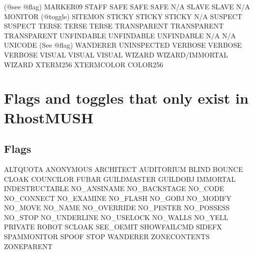 \documentclass[letterpaper,10pt,english]{sphinxmanual}
\begin{document}
\begin{description}
(@see @flag)            MARKER0\sphinxhyphen{}9                              STAFF
SAFE                    SAFE                                   SAFE
N/A                     SLAVE                                  SLAVE
N/A                     MONITOR (@toggle)                      SITEMON
STICKY                  STICKY                                 STICKY
N/A                     SUSPECT                                SUSPECT
TERSE                   TERSE                                  TERSE
TRANSPARENT             TRANSPARENT                            TRANSPARENT
UNFINDABLE              UNFINDABLE                             UNFINDABLE
N/A                     N/A                                    UNICODE
(See @flag)             WANDERER                               UNINSPECTED
VERBOSE                 VERBOSE                                VERBOSE
VISUAL                  VISUAL                                 VISUAL
WIZARD                  WIZARD/IMMORTAL                        WIZARD
XTERM256                XTERMCOLOR                             COLOR256

\end{description}


\section{Flags and toggles that only exist in RhostMUSH}
\label{\detokenize{differences:flags-and-toggles-that-only-exist-in-rhostmush}}

\subsection{Flags}
\label{\detokenize{differences:flags}}
\sphinxAtStartPar
ALTQUOTA                     ANONYMOUS                     ARCHITECT
AUDITORIUM                   BLIND                         BOUNCE
CLOAK                        COUNCILOR                     FUBAR
GUILDMASTER                  GUILDOBJ                      IMMORTAL
INDESTRUCTABLE               NO\_ANSINAME                   NO\_BACKSTAGE
NO\_CODE                      NO\_CONNECT                    NO\_EXAMINE
NO\_FLASH                     NO\_GOBJ                       NO\_MODIFY
NO\_MOVE                      NO\_NAME                       NO\_OVERRIDE
NO\_PESTER                    NO\_POSSESS                    NO\_STOP
NO\_UNDERLINE                 NO\_USELOCK                    NO\_WALLS
NO\_YELL                      PRIVATE                       ROBOT
SCLOAK                       SEE\_OEMIT                     SHOWFAILCMD
SIDEFX                       SPAMMONITOR                   SPOOF
STOP                         WANDERER                      ZONECONTENTS
ZONEPARENT
\end{document}
